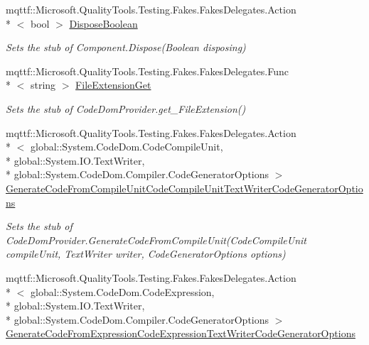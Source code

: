 \begin{DoxyCompactItemize}
mqttf\-::\-Microsoft.\-Quality\-Tools.\-Testing.\-Fakes.\-Fakes\-Delegates.\-Action\\*
$<$ bool $>$ \hyperlink{class_system_1_1_code_dom_1_1_compiler_1_1_fakes_1_1_stub_code_dom_provider_a21358b1745e1cbaab6c9310adee7d3f8}{Dispose\-Boolean}
\begin{DoxyCompactList}\small\item\em Sets the stub of Component.\-Dispose(\-Boolean disposing)\end{DoxyCompactList}\item 
mqttf\-::\-Microsoft.\-Quality\-Tools.\-Testing.\-Fakes.\-Fakes\-Delegates.\-Func\\*
$<$ string $>$ \hyperlink{class_system_1_1_code_dom_1_1_compiler_1_1_fakes_1_1_stub_code_dom_provider_a02015b6fe2118e49f35ae1350befd3a2}{File\-Extension\-Get}
\begin{DoxyCompactList}\small\item\em Sets the stub of Code\-Dom\-Provider.\-get\-\_\-\-File\-Extension()\end{DoxyCompactList}\item 
mqttf\-::\-Microsoft.\-Quality\-Tools.\-Testing.\-Fakes.\-Fakes\-Delegates.\-Action\\*
$<$ global\-::\-System.\-Code\-Dom.\-Code\-Compile\-Unit, \\*
global\-::\-System.\-I\-O.\-Text\-Writer, \\*
global\-::\-System.\-Code\-Dom.\-Compiler.\-Code\-Generator\-Options $>$ \hyperlink{class_system_1_1_code_dom_1_1_compiler_1_1_fakes_1_1_stub_code_dom_provider_a937761bd8c466f9ccf0e0088bbcde5db}{Generate\-Code\-From\-Compile\-Unit\-Code\-Compile\-Unit\-Text\-Writer\-Code\-Generator\-Options}
\begin{DoxyCompactList}\small\item\em Sets the stub of Code\-Dom\-Provider.\-Generate\-Code\-From\-Compile\-Unit(\-Code\-Compile\-Unit compile\-Unit, Text\-Writer writer, Code\-Generator\-Options options)\end{DoxyCompactList}\item 
mqttf\-::\-Microsoft.\-Quality\-Tools.\-Testing.\-Fakes.\-Fakes\-Delegates.\-Action\\*
$<$ global\-::\-System.\-Code\-Dom.\-Code\-Expression, \\*
global\-::\-System.\-I\-O.\-Text\-Writer, \\*
global\-::\-System.\-Code\-Dom.\-Compiler.\-Code\-Generator\-Options $>$ \hyperlink{class_system_1_1_code_dom_1_1_compiler_1_1_fakes_1_1_stub_code_dom_provider_a634eb89aa8061fc6b9c920f3343eb2a2}{Generate\-Code\-From\-Expression\-Code\-Expression\-Text\-Writer\-Code\-Generator\-Options}

\end{DoxyCompactItemize}
